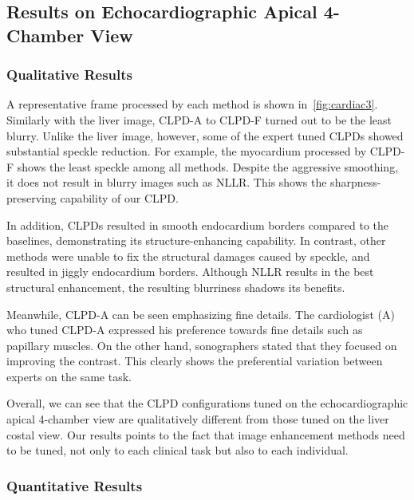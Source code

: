 \subsection{Results on Echocardiographic Apical 4-Chamber View}\label{section:fourchamber}

\subsubsection{Qualitative Results}
A representative frame processed by each method is shown in~\cref{fig:cardiac3}.
Similarly with the liver image, CLPD-A to CLPD-F turned out to be the least blurry.
Unlike the liver image, however, some of the expert tuned CLPDs showed substantial speckle reduction.
For example, the myocardium processed by CLPD-F shows the least speckle among all methods.
Despite the aggressive smoothing, it does not result in blurry images such as NLLR.
This shows the sharpness-preserving capability of our CLPD.

In addition, CLPDs resulted in smooth endocardium borders compared to the baselines, demonstrating its structure-enhancing capability.
In contrast, other methods were unable to fix the structural damages caused by speckle, and resulted in jiggly endocardium borders.
Although NLLR results in the best structural enhancement, the resulting blurriness shadows its benefits.

Meanwhile, CLPD-A can be seen emphasizing fine details.
The cardiologist (A) who tuned CLPD-A expressed his preference towards fine details such as papillary muscles.
On the other hand, sonographers stated that they focused on improving the contrast.
This clearly shows the preferential variation between experts on the same task.

Overall, we can see that the CLPD configurations tuned on the echocardiographic apical 4-chamber view are qualitatively different from those tuned on the liver costal view.
Our results points to the fact that image enhancement methods need to be tuned, not only to each clinical task but also to each individual.

\subsubsection{Quantitative Results}


